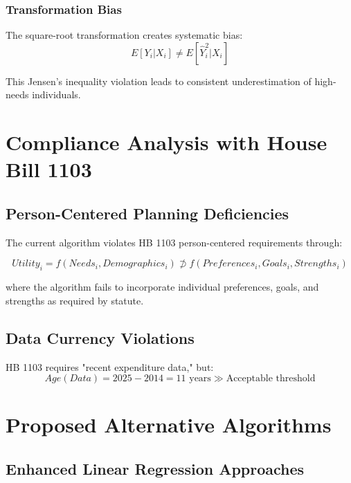 \subsubsection{Transformation Bias}
The square-root transformation creates systematic bias:
\begin{equation}
E[Y_i | X_i] \neq E[\hat{Y}_i^2 | X_i]
\end{equation}

This Jensen's inequality violation leads to consistent underestimation of high-needs individuals.

\section{Compliance Analysis with House Bill 1103}

\subsection{Person-Centered Planning Deficiencies}

The current algorithm violates HB 1103 person-centered requirements through:

\begin{equation}
Utility_i = f(Needs_i, Demographics_i) \not\supset f(Preferences_i, Goals_i, Strengths_i)
\end{equation}

where the algorithm fails to incorporate individual preferences, goals, and strengths as required by statute.

\subsection{Data Currency Violations}

HB 1103 requires "recent expenditure data," but:
\begin{equation}
Age(Data) = 2025 - 2014 = 11 \text{ years} \gg \text{Acceptable threshold}
\end{equation}

\section{Proposed Alternative Algorithms}

\subsection{Enhanced Linear Regression Approaches}


